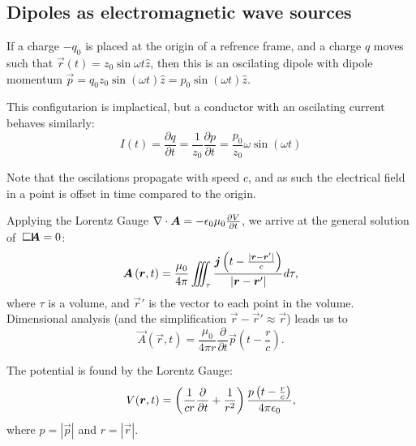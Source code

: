 \subsection{Dipoles as electromagnetic wave sources}
    If a charge $-q_0$ is placed at the origin of a refrence frame, 
    and a charge $q$ moves such that $\vec{r}(t) = z_0 \sin\omega t \hat{z}$, 
    then this is an oscilating dipole with dipole momentum 
    $\vec{p} = q_0 z_0 \sin\left(\omega t\right)\hat{z} = p_0 \sin\left(\omega t\right)\hat{z}$.

    This configutarion is implactical, but a conductor with an oscilating current behaves similarly:
    \begin{equation*}
        I(t) = \frac{\partial q}{\partial t} = \frac{1}{z_0} \frac{\partial p}{\partial t} = \frac{p_0}{z_0}\omega\sin\left(\omega t\right)
    \end{equation*}

    Note that the oscilations propagate with speed $c$, and as such the electrical field in a point is offset in time compared to the origin.
    
    Applying the Lorentz Gauge $\nabla\cdot\bm{A} = -\epsilon_0\mu_0\frac{\partial V}{\partial t}$, we arrive at the general solution of $\dalambert\vec{A} = 0$:
    \begin{equation}
        \bm{A}\left(\bm{r}, t\right) =  
        \frac{\mu_0}{4\pi}\iiint_\tau \frac{\bm{j}\left(t - \frac{|\bm{r} - \bm{r}'|}{c}\right)}{|\bm{r} - \bm{r}'|}d\tau,
    \end{equation}
    where $\tau$ is a volume, and $\vec{r}'$ is the vector to each point in the volume.
    Dimensional analysis (and the simplification $\vec{r} - \vec{r}' \approx \vec{r}$) leads us to 
    \begin{equation}
        \vec{A}\left(\vec{r}, t\right) = \frac{\mu_0}{4\pi r} \frac{\partial }{\partial t}\vec{p}\left(t - \frac{{r}}{c}\right).
    \end{equation} 

    The potential is found by the Lorentz Gauge:
    \begin{equation}
        V(\bm{r}, t) =
        \left(\frac{1}{cr}\frac{\partial}{\partial t} + \frac{1}{r^2} \right)
        \frac{p\left(t - \frac{{r}}{c}\right)}{4\pi\epsilon_0},
    \end{equation}
    where $p = |\vec{p}|$ and $r = |\vec{r}|$.

